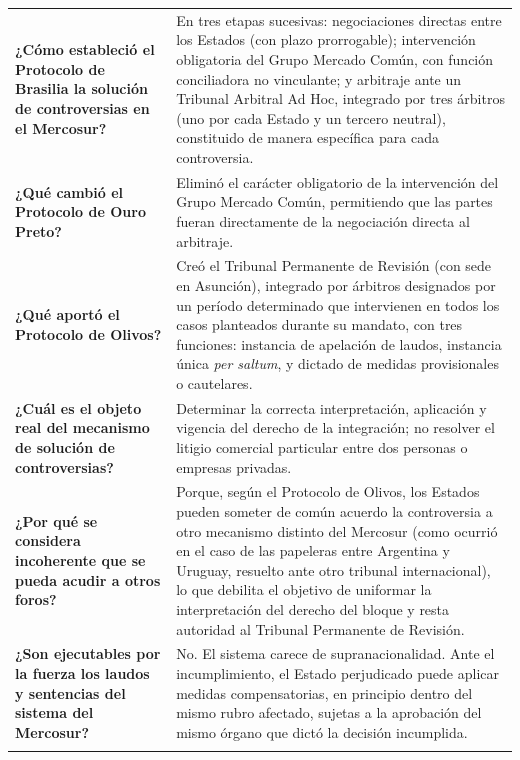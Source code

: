 \documentclass[12pt,oneside]{book}
\begin{document}
\begin{longtable}{@{}
    >{\raggedright\arraybackslash}p{}
    >{\raggedright\arraybackslash}p{}@{}
}
\textbf{¿Cómo estableció el Protocolo de Brasilia la solución de controversias en el Mercosur?} &
En tres etapas sucesivas: negociaciones directas entre los Estados (con plazo prorrogable); intervención obligatoria del Grupo Mercado Común, con función conciliadora no vinculante; y arbitraje ante un Tribunal Arbitral Ad Hoc, integrado por tres árbitros (uno por cada Estado y un tercero neutral), constituido de manera específica para cada controversia. \\
\addlinespace

\textbf{¿Qué cambió el Protocolo de Ouro Preto?} &
Eliminó el carácter obligatorio de la intervención del Grupo Mercado Común, permitiendo que las partes fueran directamente de la negociación directa al arbitraje. \\
\addlinespace

\textbf{¿Qué aportó el Protocolo de Olivos?} &
Creó el Tribunal Permanente de Revisión (con sede en Asunción), integrado por árbitros designados por un período determinado que intervienen en todos los casos planteados durante su mandato, con tres funciones: instancia de apelación de laudos, instancia única \textit{per saltum}, y dictado de medidas provisionales o cautelares. \\
\addlinespace

\textbf{¿Cuál es el objeto real del mecanismo de solución de controversias?} &
Determinar la correcta interpretación, aplicación y vigencia del derecho de la integración; no resolver el litigio comercial particular entre dos personas o empresas privadas. \\
\addlinespace

\textbf{¿Por qué se considera incoherente que se pueda acudir a otros foros?} &
Porque, según el Protocolo de Olivos, los Estados pueden someter de común acuerdo la controversia a otro mecanismo distinto del Mercosur (como ocurrió en el caso de las papeleras entre Argentina y Uruguay, resuelto ante otro tribunal internacional), lo que debilita el objetivo de uniformar la interpretación del derecho del bloque y resta autoridad al Tribunal Permanente de Revisión. \\
\addlinespace

\textbf{¿Son ejecutables por la fuerza los laudos y sentencias del sistema del Mercosur?} &
No. El sistema carece de supranacionalidad. Ante el incumplimiento, el Estado perjudicado puede aplicar medidas compensatorias, en principio dentro del mismo rubro afectado, sujetas a la aprobación del mismo órgano que dictó la decisión incumplida. \\
\addlinespace


\end{longtable}
\end{document}
